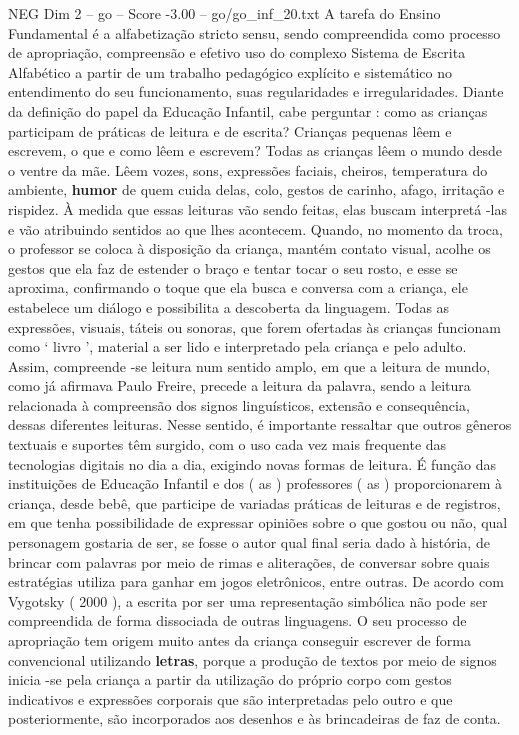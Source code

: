 \begin{textsample}{NEG Dim 2 – go – Score -3.00 – go/go\_inf\_20.txt}
A tarefa do Ensino Fundamental é a alfabetização stricto sensu, sendo compreendida como processo de apropriação, compreensão e efetivo uso do complexo Sistema de Escrita Alfabético a partir de um trabalho pedagógico explícito e sistemático no entendimento do seu funcionamento, suas regularidades e irregularidades.
Diante da definição do papel da Educação Infantil, cabe perguntar : como as crianças participam de práticas de leitura e de escrita?
Crianças pequenas lêem e escrevem, o que e como lêem e escrevem?
Todas as crianças lêem o mundo desde o ventre da mãe.
Lêem vozes, sons, expressões faciais, cheiros, temperatura do ambiente, \textbf{humor} de quem cuida delas, colo, gestos de carinho, afago, irritação e rispidez.
À medida que essas leituras vão sendo feitas, elas buscam interpretá -las e vão atribuindo sentidos ao que lhes acontecem.
Quando, no momento da troca, o professor se coloca à disposição da criança, mantém contato visual, acolhe os gestos que ela faz de estender o braço e tentar tocar o seu rosto, e esse se aproxima, confirmando o toque que ela busca e conversa com a criança, ele estabelece um diálogo e possibilita a descoberta da linguagem.
Todas as expressões, visuais, táteis ou sonoras, que forem ofertadas às crianças funcionam como ‘ livro ’, material a ser lido e interpretado pela criança e pelo adulto.
Assim, compreende -se leitura num sentido amplo, em que a leitura de mundo, como já afirmava Paulo Freire, precede a leitura da palavra, sendo a leitura relacionada à compreensão dos signos linguísticos, extensão e consequência, dessas diferentes leituras.
Nesse sentido, é importante ressaltar que outros gêneros textuais e suportes têm surgido, com o uso cada vez mais frequente das tecnologias digitais no dia a dia, exigindo novas formas de leitura.
É função das instituições de Educação Infantil e dos ( as ) professores ( as ) proporcionarem à criança, desde bebê, que participe de variadas práticas de leituras e de registros, em que tenha possibilidade de expressar opiniões sobre o que gostou ou não, qual personagem gostaria de ser, se fosse o autor qual final seria dado à história, de brincar com palavras por meio de rimas e aliterações, de conversar sobre quais estratégias utiliza para ganhar em jogos eletrônicos, entre outras.
De acordo com Vygotsky ( 2000 ), a escrita por ser uma representação simbólica não pode ser compreendida de forma dissociada de outras linguagens.
O seu processo de apropriação tem origem muito antes da criança conseguir escrever de forma convencional utilizando \textbf{letras}, porque a produção de textos por meio de signos inicia -se pela criança a partir da utilização do próprio corpo com gestos indicativos e expressões corporais que são interpretadas pelo outro e que posteriormente, são incorporados aos desenhos e às brincadeiras de faz de conta.

\end{textsample}
